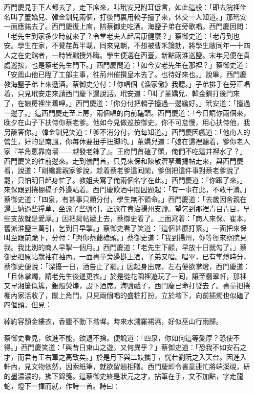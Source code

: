 西門慶見手下人都去了，走下席來，叫玳安兒附耳低言，如此這般：「即去院裡坐名叫了董嬌兒、韓金釧兒兩個，打後門裏用轎子擡了來，休交一人知道。」那玳安一面應諾去了。西門慶復上席，陪蔡御史吃酒。海鹽子弟在旁歌唱。西門慶因問：「老先生到家多少時就來了？令堂老夫人起居康健麼？」蔡御史道：「老母到也安。學生在家，不覺荏苒半載，囘來見朝，不想被曹禾論劾，將學生敝同年一十四人之在史館者，一時皆黜授外職。{}學生便選在西臺，新點兩淮巡鹽。宋年兄便在貴處巡按，也是蔡老先生門下。」西門慶問道：「如今安老先生在那裡？」蔡御史道：「安鳳山他已陞了工部主事，徃荊州催攢皇木去了。也待好來也。」說畢，西門慶教海鹽子弟上來遞酒。蔡御史分付：「你唱個《漁家傲》我聽。」子弟排手在旁正唱着，只見玳安走來請西門慶下邊說話。玳安道：「叫了董嬌兒、韓金釧打後門來了，在娘房裡坐着哩。」西門慶道：「你分付把轎子擡過一邊纔好。」玳安道：「擡過一邊了。」這西門慶走至上房，兩個唱的向前磕頭。西門慶道：「今日請你兩個來，晚夕在山子下扶侍你蔡老爹。他如今見做巡按御史，你不可怠慢，用心扶侍他，我另酬答你。」韓金釧兒笑道：「爹不消分付，俺每知道。」西門慶因戲道：「他南人的營生，好的是南風，你每休要扭手扭脚的。」董嬌兒道：「娘在這裡聽着，爹你老人家『羊角蔥靠南墻——越發老辣了』。王府門首磕了頭，俺們不吃這井裡水了？」西門慶笑的徃前邊來。走到儀門首，只見來保和陳敬濟拏着揭帖走來，與西門慶看，說道：「剛纔喬親家爹說，趁着蔡老爹這囘閑，爹倒把這件事對蔡老爹說了罷，只怕明日起身忙了。教姐夫寫了俺兩個名字在此。」西門慶道：「你跟了來。」來保跟到捲棚槅子外邊站着。西門慶飲酒中間因題起：「有一事在此，不敢干瀆。」蔡御史道：「四泉，有甚事只顧分付，學生無不領命。」西門慶道：「去歲因舍親在邊上納過些糧草，坐派了些鹽引，正派在貴治揚州支鹽。望乞到那裡青目青目，早些支放就是愛厚。」因把揭帖遞上去，蔡御史看了。上面寫着：「商人來保、崔本，舊派淮鹽三萬引，乞到日早掣。」蔡御史看了笑道：「這個甚麼打緊。」一面把來保叫至跟前跪下，分付：「與你蔡爺磕頭。」蔡御史道：「我到揚州，你等徑來察院見我。我比別的商人早掣一個月。」西門慶道：「老先生下顧，早放十日就勾了。」蔡御史把原帖就袖在袖內。一面書童旁邊斟上酒，子弟又唱。唱畢，已有掌燈時分，蔡御史便說：「深擾一日，酒告止了罷。」因起身出席，左右便欲掌燈，西門慶道：「且休掌燭，請老先生後邊更衣。」於是從花園裡遊玩了一囘，讓至翡翠軒，那裡又早湘簾低簇，銀燭熒煌，設下酒席。海鹽戲子，西門慶已命打發去了。書童把捲棚內家活收了，關上角門，只見兩個唱的盛粧打扮，立於堦下，向前插燭也似磕了四個頭。但見：

綽約容顏金縷衣，香塵不動下堦墀。時來水濺羅裙濕，好似巫山行雨歸。

蔡御史看見，欲進不能，欲退不捨。便說道：「四泉，你如何這等愛厚？恐使不得。」西門慶笑道：「與昔日東山之遊，又何異乎？」蔡御史道：「恐我不如安石之才，而君有王右軍之高致矣。」於是月下與二妓攜手，恍若劉阮之入天台。因進入軒內，見文物依然，因索紙筆，就欲留題相贈。西門慶即令書童連忙將端溪硯，研的墨濃濃的，拂下錦箋。這蔡御史終是狀元之才，拈筆在手，文不加點，字走龍蛇，燈下一揮而就，作詩一首。詩曰：

